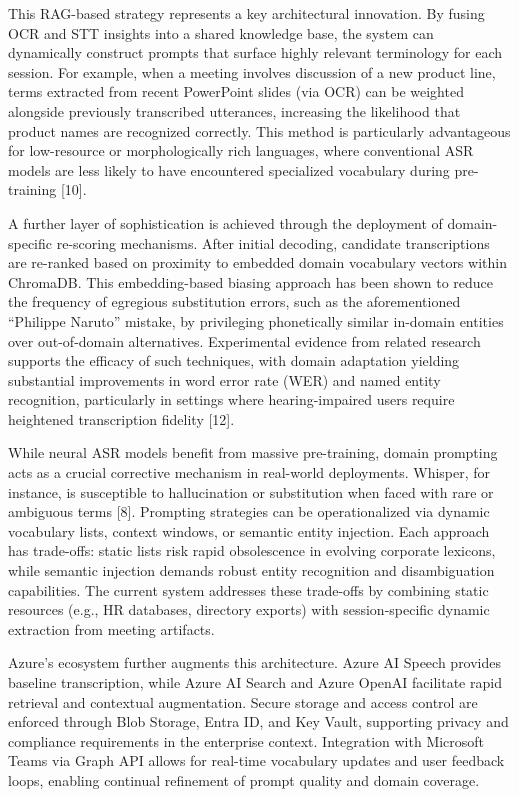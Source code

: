 \documentclass[12pt,a4paper]{article}
\begin{document}
This RAG-based strategy represents a key architectural innovation. By fusing OCR and STT insights into a shared knowledge base, the system can dynamically construct prompts that surface highly relevant terminology for each session. For example, when a meeting involves discussion of a new product line, terms extracted from recent PowerPoint slides (via OCR) can be weighted alongside previously transcribed utterances, increasing the likelihood that product names are recognized correctly. This method is particularly advantageous for low-resource or morphologically rich languages, where conventional ASR models are less likely to have encountered specialized vocabulary during pre-training [10].


A further layer of sophistication is achieved through the deployment of domain-specific re-scoring mechanisms. After initial decoding, candidate transcriptions are re-ranked based on proximity to embedded domain vocabulary vectors within ChromaDB. This embedding-based biasing approach has been shown to reduce the frequency of egregious substitution errors, such as the aforementioned “Philippe Naruto” mistake, by privileging phonetically similar in-domain entities over out-of-domain alternatives. Experimental evidence from related research supports the efficacy of such techniques, with domain adaptation yielding substantial improvements in word error rate (WER) and named entity recognition, particularly in settings where hearing-impaired users require heightened transcription fidelity [12].


While neural ASR models benefit from massive pre-training, domain prompting acts as a crucial corrective mechanism in real-world deployments. Whisper, for instance, is susceptible to hallucination or substitution when faced with rare or ambiguous terms [8]. Prompting strategies can be operationalized via dynamic vocabulary lists, context windows, or semantic entity injection. Each approach has trade-offs: static lists risk rapid obsolescence in evolving corporate lexicons, while semantic injection demands robust entity recognition and disambiguation capabilities. The current system addresses these trade-offs by combining static resources (e.g., HR databases, directory exports) with session-specific dynamic extraction from meeting artifacts.


Azure’s ecosystem further augments this architecture. Azure AI Speech provides baseline transcription, while Azure AI Search and Azure OpenAI facilitate rapid retrieval and contextual augmentation. Secure storage and access control are enforced through Blob Storage, Entra ID, and Key Vault, supporting privacy and compliance requirements in the enterprise context. Integration with Microsoft Teams via Graph API allows for real-time vocabulary updates and user feedback loops, enabling continual refinement of prompt quality and domain coverage.
\end{document}
